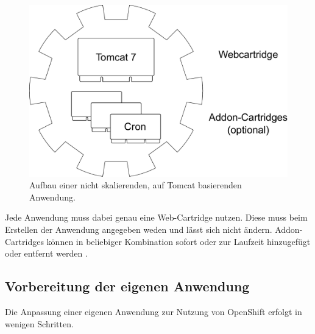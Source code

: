 \documentclass[10pt,a4paper,compsoc]{IEEEtran}
\begin{document}
\begin{figure}[htbp]
\centering
\includegraphics[width=0.8\linewidth]{imgs/cartridges}
\caption{Aufbau einer nicht skalierenden, auf Tomcat basierenden Anwendung.}
\label{fig:cartridges}
\end{figure}

Jede Anwendung muss dabei genau eine Web-Cartridge nutzen. Diese muss beim Erstellen der Anwendung angegeben weden und lässt sich nicht ändern. Addon-Cartridges können in beliebiger Kombination sofort oder zur Laufzeit hinzugefügt oder entfernt werden \cite[S. 28]{os_user_guide}.

\subsection{Vorbereitung der eigenen Anwendung}
Die Anpassung einer eigenen Anwendung zur Nutzung von OpenShift erfolgt in wenigen Schritten.
\end{document}
